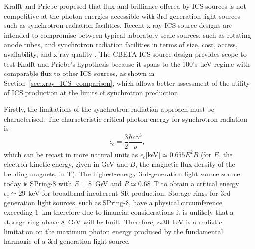 \documentclass[../main.tex]{subfiles}
\begin{document}
Krafft and Priebe \cite{krafft2010compton} proposed that flux and brilliance offered by ICS sources is not competitive at the photon energies accessible with 3rd generation light sources such as synchrotron radiation facilities. Recent x-ray ICS source designs are intended to compromise between typical laboratory-scale sources, such as rotating anode tubes, and synchrotron radiation facilities in terms of size, cost, access, availability, and x-ray quality \cite{deitrick2018high}. The CBETA ICS source design provides scope to test Krafft and Priebe's hypothesis because it spans to the 100's~\si{\kilo\electronvolt} regime with comparable flux to other ICS sources, as shown in Section~\ref{sec:xray_ICS_comparison}, which allows better assessment of the utility of ICS production at the limits of synchrotron production.

Firstly, the limitations of the synchrotron radiation approach must be characterised. The characteristic critical photon energy for synchrotron radiation is
\begin{equation}
\epsilon_{c}=\frac{3}{2}\frac{\hbar c \gamma^3}{\rho},
\label{eq:synchrotron_critical_energy}
\end{equation}
which can be recast in more natural units as $\epsilon_{c}$[\si{\kilo\electronvolt}]$\simeq 0.665E^{2}B$ (for $E$, the electron kinetic energy, given in \si{\giga\electronvolt} and $B$, the magnetic flux density of the bending magnets, in \si{\tesla}). The highest-energy 3rd-generation light source source today is SPring-8 with $E = 8$~\si{\giga\electronvolt} and $B\simeq 0.68$~\si{\tesla} to obtain a critical energy $\epsilon_{c}\simeq 29$~\si{\kilo\electronvolt} for broadband incoherent SR production. Storage rings for 3rd generation light sources, such as SPring-8, have a physical circumference exceeding 1~\si{\kilo\meter} therefore due to financial considerations it is unlikely that a storage ring above 8~\si{\giga\electronvolt} will be built. Therefore, $\sim30$~\si{\kilo\electronvolt} is a realistic limitation on the maximum photon energy produced by the fundamental harmonic of a 3rd generation light source.
\end{document}
